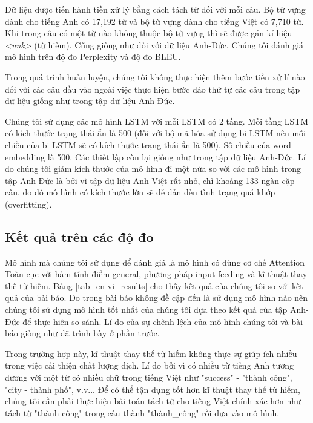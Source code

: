Dữ liệu được tiến hành tiền xử lý bằng cách tách từ đối với mỗi câu. Bộ từ vựng dành cho tiếng Anh có 17,192 từ và bộ từ vựng dành cho tiếng Việt có 7,710 từ. Khi trong câu có một từ nào không thuộc bộ từ vựng thì sẽ được gán kí hiệu \textit{<unk>} (từ hiếm). Cũng giống như đối với dữ liệu Anh-Đức. Chúng tôi đánh giá mô hình trên độ đo Perplexity và độ đo BLEU.

Trong quá trình huấn luyện, chúng tôi không thực hiện thêm bước tiền xử lí nào đối với các câu đầu vào ngoài việc thực hiện bước đảo thứ tự các câu trong tập dữ liệu giống như trong tập dữ liệu Anh-Đức.

Chúng tôi sử dụng các mô hình LSTM với mỗi LSTM có 2 tầng. Mỗi tầng LSTM có kích thước trạng thái ẩn là 500 (đối với bộ mã hóa sử dụng bi-LSTM nên mỗi chiều của bi-LSTM sẽ có kích thước trạng thái ẩn là 500). Số chiều của word embedding là 500. Các thiết lập còn lại giống như trong tập dữ liệu Anh-Đức. Lí do chúng tôi giảm kích thước của mô hình đi một nửa so với các mô hình trong tập Anh-Đức là bởi vì tập dữ liệu Anh-Việt rất nhỏ, chỉ khoảng 133 ngàn cặp câu, do đó mô hình có kích thước lớn sẽ dễ dẫn đến tình trạng quá khớp (overfitting).

\subsection{Kết quả trên các độ đo}

Mô hình mà chúng tôi sử dụng để đánh giá là mô hình có dùng cơ chế Attention Toàn cục với hàm tính điểm general, phương pháp input feeding và kĩ thuật thay thế từ hiếm. Bảng \ref{tab_en-vi_results} cho thấy kết quả của chúng tôi so với kết quả của bài báo. Do trong bài báo \cite{AnhVietpaper} không đề cập đến là sử dụng mô hình nào nên chúng tôi sử dụng mô hình tốt nhất của chúng tôi dựa theo kết quả của tập Anh-Đức để thực hiện so sánh. Lí do của sự chênh lệch của mô hình chúng tôi và bài báo giống như đã trình bày ở phần trước.

Trong trường hợp này, kĩ thuật thay thế từ hiếm không thực sự giúp ích nhiều trong việc cải thiện chất lượng dịch. Lí do bởi vì có nhiều từ tiếng Anh tương đương với một từ có nhiều chữ trong tiếng Việt như "success" - "thành công", "city - thành phố", v.v... Để có thể tận dụng tốt hơn kĩ thuật thay thế từ hiếm, chúng tôi cần phải thực hiện bài toán tách từ cho tiếng Việt chính xác hơn như tách từ "thành công" trong câu thành "thành\_công" rồi đưa vào mô hình.



